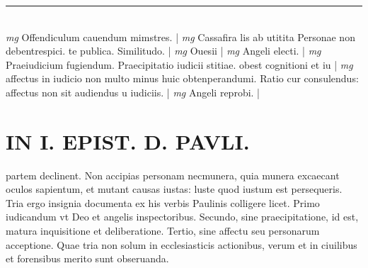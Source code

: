 \documentclass{article}
\begin{document}
\begin{pages}
\vspace{0.5cm}\noindent
\vspace{0.2cm}\rule{1cm}{0.2pt}\\ 
\hspace{0.2cm}\textit{mg}
\footnotesize Offendiculum cauendum mimstres. 
\normalsize| 
\hspace{0.2cm}\textit{mg}
\footnotesize Cassafira lis ab utitita Personae non debentrespici. te publica. Similitudo. 
\normalsize| 
\hspace{0.2cm}\textit{mg}
\footnotesize Ouesii
\normalsize| 
\hspace{0.2cm}\textit{mg}
\footnotesize Angeli electi. 
\normalsize| 
\hspace{0.2cm}\textit{mg}
\footnotesize Praeiudicium fugiendum. Praecipitatio iudicii stitiae. obest cognitioni et iu
\normalsize| 
\hspace{0.2cm}\textit{mg}
\footnotesize affectus in iudicio non multo minus huic obtenperandumi. Ratio cur consulendus: affectus non sit audiendus u iudiciis. 
\normalsize| 
\hspace{0.2cm}\textit{mg}
\footnotesize Angeli reprobi. 
\normalsize| 
\section*{IN I. EPIST. D. PAVLI. }
\marginpar{[ p.117 ]}\pstart partem declinent. Non accipias personam necmunera, quia munera excaecant oculos sapientum, et mutant causas iustas: luste quod iustum est persequeris. Tria ergo insignia documenta ex his verbis Paulinis colligere licet. Primo iudicandum vt Deo et angelis inspectoribus. Secundo, sine praecipitatione, id est, matura inquisitione et deliberatione. Tertio, sine affectu seu personarum acceptione. Quae tria non solum in ecclesiasticis actionibus, verum et in ciuilibus et forensibus merito sunt obseruanda.  \pend
{}
{}

\end{pages}
\end{document}
